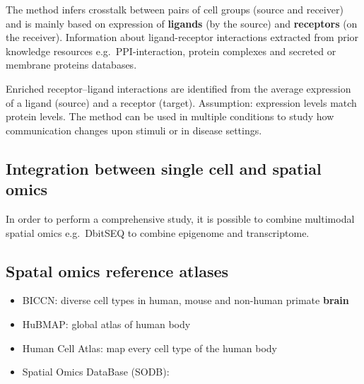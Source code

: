 The method infers crosstalk between pairs of cell groups (source and
receiver) and is mainly based on expression of \textbf{ligands} (by the
source) and \textbf{receptors} (on the receiver). Information about
ligand-receptor interactions extracted from prior knowledge resources
e.g.~PPI-interaction, protein complexes and secreted or membrane
proteins databases.

Enriched receptor--ligand interactions are identified from the average
expression of a ligand (source) and a receptor (target). Assumption:
expression levels match protein levels. The method can be used in
multiple conditions to study how communication changes upon stimuli or
in disease settings.

\hypertarget{integration-between-single-cell-and-spatial-omics}{%
\subsection{Integration between single cell and spatial
omics}\label{integration-between-single-cell-and-spatial-omics}}

In order to perform a comprehensive study, it is possible to combine
multimodal spatial omics e.g.~DbitSEQ to combine epigenome and
transcriptome.

\hypertarget{spatal-omics-reference-atlases}{%
\subsection{Spatal omics reference
atlases}\label{spatal-omics-reference-atlases}}

\begin{itemize}
\tightlist
\item
  BICCN: diverse cell types in human, mouse and non-human primate
  \textbf{brain}
\item
  HuBMAP: global atlas of human body
\item
  Human Cell Atlas: map every cell type of the human body
\item
  Spatial Omics DataBase (SODB):
\end{itemize}
